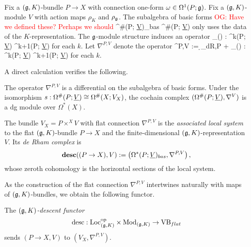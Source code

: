 \documentclass[10pt]{amsart}
\def\owen{\textcolor{red}{OG: }\textcolor{red}}
\begin{document}
Fix a $(\mathfrak g,K)$-bundle $P \to X$ with connection one-form $\omega \in \Omega^1(P; \mathfrak g)$. Fix a $(\mathfrak g,K)$-module $V$ with action maps $\rho_K$ and $\rho_{\mathfrak g}$. The subalgebra of basic forms \owen{Have we defined these? Perhaps we should}
\ben
\Omega^{\#}(P; \ul{V})_{bas} \subset \Omega^{\#}(P; \ul{V})
\een
only uses the data of the $K$-representation. The $\mathfrak g$-module structure induces an operator
\ben
\rho_\fg(\omega) : \Omega^k(P; \ul{V}) \to \Omega^{k+1}(P; \ul{V})
\een
for each $k$. Let $\nabla^{P,V}$ denote the operator
\ben
\nabla^{P,V} := \d_{dR,P} + \rho_\fg(\omega) : \Omega^k(P; \ul{V}) \to \Omega^{k+1}(P; \ul{V})
\een 
for each $k$. 

A direct calculation verifies the following. 

\begin{lemma} 
The operator $\nabla^{P,V}$ is a differential on the subalgebra of basic forms.
Under the isomorphism $s: \Omega^{\#}(P; \underline{V}) \cong \Omega^{\#}(X;
V_X)$, the cochain complex $(\Omega^{\#}(P; \underline{V}), \nabla^V)$ is a
dg module over $\Omega^*(X)$. 
\end{lemma}


\begin{dfn}
The bundle $V_X = P \times^X V$ with flat connection $\nabla^{P,V}$ is
the {\em associated local system} to the flat $(\mathfrak g,K)$-bundle $P \to X$ and the finite-dimensional $(\mathfrak g,K)$-representation $V$.
Its {\em de Rham complex} is
\[
\mathbf{desc}((P \to X), V) := \left(\Omega^*(P; \underline{V})_{bas}, \nabla^{P,V}\right),
\]
whose zeroth cohomology is the horizontal sections of the local system.
\end{dfn}

As the construction of the flat connection $\nabla^{P,V}$ intertwines naturally with maps of $(\mathfrak g,K)$-bundles, we obtain the following functor.

\begin{dfn}
The {\em $(\mathfrak g,K)$-descent functor} 
\[
{\rm desc}: {\rm Loc}_{(\mathfrak g,K)}^{{\rm op}} \times {\rm Mod}_{(\mathfrak g,K)} \to {\rm VB}_{flat}
\]
sends $(P \to X, V)$ to $(V_X,\nabla^{P,V})$.
\end{dfn}
\end{document}
